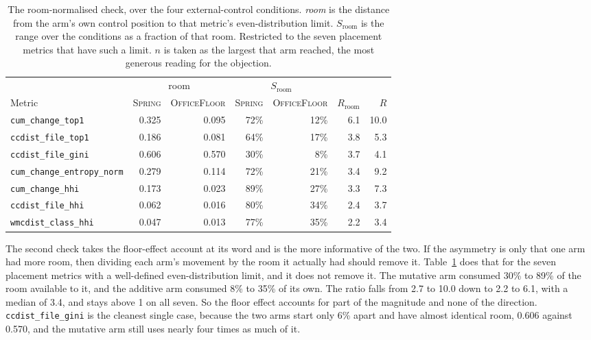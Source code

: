 \documentclass[11pt,a4paper]{article}
\newcommand{\sprg}{\textsc{Spring}}
\newcommand{\offl}{\textsc{OfficeFloor}}
\begin{document}
\begin{table}[h]
\centering
\caption{The room-normalised check, over the four external-control conditions.
\emph{room} is the distance from the arm's own control position to that metric's
even-distribution limit. $S_{\text{room}}$ is the range over the conditions as a
fraction of that room. Restricted to the seven placement metrics that have such a
limit. $n$ is taken as the largest that arm reached, the most generous reading for
the objection.}
\label{tab:room}
\footnotesize
\setlength{\tabcolsep}{5pt}
\begin{tabular}{lrrrrrr}
\toprule
 & \multicolumn{2}{c}{room} & \multicolumn{2}{c}{$S_{\text{room}}$} & & \\
\cmidrule(lr){2-3}\cmidrule(lr){4-5}
Metric & \sprg{} & \offl{} & \sprg{} & \offl{} & $R_{\text{room}}$ & $R$ \\
\midrule
\texttt{cum\_change\_top1}          & 0.325 & 0.095 & 72\% & 12\% & 6.1 & 10.0 \\
\texttt{ccdist\_file\_top1}         & 0.186 & 0.081 & 64\% & 17\% & 3.8 & 5.3 \\
\texttt{ccdist\_file\_gini}         & 0.606 & 0.570 & 30\% &  8\% & 3.7 & 4.1 \\
\texttt{cum\_change\_entropy\_norm} & 0.279 & 0.114 & 72\% & 21\% & 3.4 & 9.2 \\
\texttt{cum\_change\_hhi}           & 0.173 & 0.023 & 89\% & 27\% & 3.3 & 7.3 \\
\texttt{ccdist\_file\_hhi}          & 0.062 & 0.016 & 80\% & 34\% & 2.4 & 3.7 \\
\texttt{wmcdist\_class\_hhi}        & 0.047 & 0.013 & 77\% & 35\% & 2.2 & 3.4 \\
\bottomrule
\end{tabular}
\end{table}

The second check takes the floor-effect account at its word and is the more
informative of the two. If the asymmetry is only that one arm had more room, then
dividing each arm's movement by the room it actually had should remove it.
Table~\ref{tab:room} does that for the seven placement metrics with a well-defined
even-distribution limit, and it does not remove it. The mutative arm consumed 30\%
to 89\% of the room available to it, and the additive arm consumed 8\% to 35\% of its
own. The ratio falls from 2.7 to 10.0 down to 2.2 to 6.1, with a median of 3.4,
and stays above 1 on all seven. So the floor effect accounts for part of the
magnitude and none of the direction. \texttt{ccdist\_file\_gini} is the cleanest
single case, because the two arms start only 6\% apart and have almost identical
room, 0.606 against 0.570, and the mutative arm still uses nearly four times as
much of it.
\end{document}
